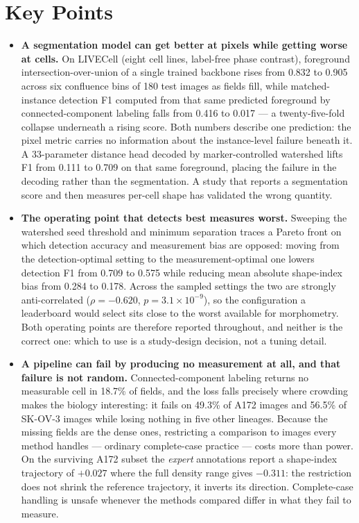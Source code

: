 \section*{Key Points}
\begin{itemize}

\item \textbf{A segmentation model can get better at pixels while getting
worse at cells.} On LIVECell (eight cell lines, label-free phase contrast),
foreground intersection-over-union of a single trained backbone rises from
0.832 to 0.905 across six confluence bins of 180 test images as fields
fill, while matched-instance detection F1 computed
from that same predicted foreground by connected-component labeling falls
from 0.416 to 0.017 --- a twenty-five-fold collapse underneath a rising
score. Both numbers describe one prediction: the pixel metric carries no information about the
instance-level failure beneath it. A 33-parameter distance head decoded by
marker-controlled watershed lifts F1 from 0.111 to 0.709 on that same
foreground, placing the failure in the decoding rather than the
segmentation. A study that reports a segmentation score and then measures
per-cell shape has validated the wrong quantity.

\item \textbf{The operating point that detects best measures worst.}
Sweeping the watershed seed threshold and minimum separation traces a Pareto
front on which detection accuracy and measurement bias are opposed: moving
from the detection-optimal setting to the measurement-optimal one lowers
detection F1 from 0.709 to 0.575 while reducing mean absolute shape-index
bias from 0.284 to 0.178. Across the sampled settings the two are strongly
anti-correlated ($\rho = -0.620$, $p = 3.1\times10^{-9}$), so the
configuration a leaderboard would select sits close to the worst available
for morphometry. Both operating points are therefore reported throughout,
and neither is the correct one: which to use is a study-design decision, not
a tuning detail.

\item \textbf{A pipeline can fail by producing no measurement at all, and
that failure is not random.} Connected-component labeling returns no
measurable cell in 18.7\% of fields, and the loss falls precisely where
crowding makes the biology interesting: it fails on 49.3\% of A172 images
and 56.5\% of SK-OV-3 images while losing nothing in five other lineages.
Because the missing fields are the dense ones, restricting a comparison to
images every method handles --- ordinary complete-case practice --- costs more
than power. On the surviving A172 subset the \emph{expert}
annotations report a shape-index trajectory of $+0.027$ where the full
density range gives $-0.311$: the restriction does not shrink the reference
trajectory, it inverts its direction. Complete-case handling is unsafe
whenever the methods compared differ in what they fail to measure.


\end{itemize}
